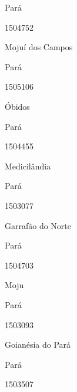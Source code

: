 \documentclass[
  letterpaper,
]{report}
\begin{document}
\n    

\n      

Pará

\n      

1504752

\n      

Mojuí dos Campos

\n    

\n    

\n      

Pará

\n      

1505106

\n      

Óbidos

\n    

\n    

\n      

Pará

\n      

1504455

\n      

Medicilândia

\n    

\n    

\n      

Pará

\n      

1503077

\n      

Garrafão do Norte

\n    

\n    

\n      

Pará

\n      

1504703

\n      

Moju

\n    

\n    

\n      

Pará

\n      

1503093

\n      

Goianésia do Pará

\n    

\n    

\n      

Pará

\n      

1503507
\end{document}
